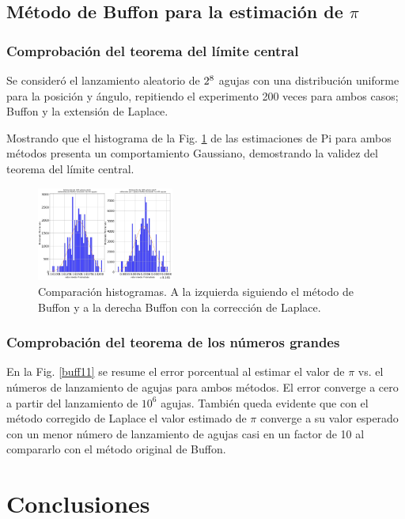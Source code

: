 \documentclass{rbf}
\begin{document}
\subsection{Método de Buffon para la estimación de $\pi$}

\subsubsection{Comprobación del teorema del límite central}

Se consideró el lanzamiento aleatorio de $2 \time 10^8$ agujas con una distribución uniforme para la posición y ángulo, repitiendo el experimento 200 veces para ambos casos; Buffon y la extensión de Laplace.

Mostrando que el histograma de la Fig. \ref{buff10} de las estimaciones de Pi para ambos métodos presenta un comportamiento Gaussiano, demostrando la validez del teorema del límite central.

\begin{figure}[h]
 \centering
  \includegraphics[width=0.4\textwidth]{figures/lap.jpg}
	\caption{Comparación histogramas. A la izquierda siguiendo el método de Buffon y a la derecha Buffon con la corrección de Laplace.}
 \label{buff10}
\end{figure}



\subsubsection{Comprobación del teorema de los números grandes}

En la Fig. \ref{buff11} se resume el error porcentual al estimar el valor de $\pi$ vs. el números de lanzamiento de agujas para ambos métodos. El error converge a cero a partir del lanzamiento de $10^6$ agujas.
También queda evidente que con el método corregido de Laplace el valor estimado de $\pi$ converge a su valor esperado con un menor número de lanzamiento de agujas casi en un factor de 10 al compararlo con el método original de Buffon. 


\section{Conclusiones}
\end{document}
